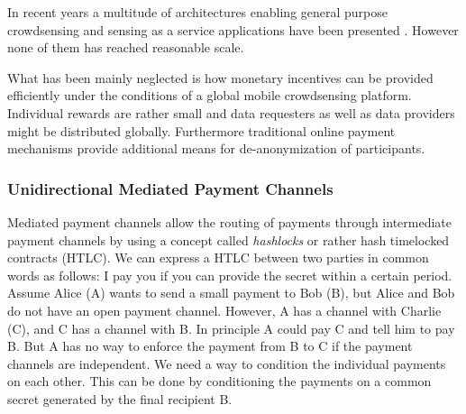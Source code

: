In recent years a multitude of architectures enabling general purpose crowdsensing and sensing as a service applications have been presented \cite{6558754,6525603,giannotti2012planetary,Haderer2015,merlino2016mobile}. However none of them has reached reasonable scale.

What has been mainly neglected is how monetary incentives can be provided efficiently under the conditions of a global mobile crowdsensing platform. 
Individual rewards are rather small and data requesters as well as data providers might be distributed globally. Furthermore traditional online payment mechanisms provide additional means for de-anonymization of participants.  


\subsubsection{Unidirectional Mediated Payment Channels}

Mediated payment channels allow the routing of payments through intermediate payment channels by using a concept called \emph{hashlocks} or rather hash timelocked contracts (HTLC). We can express a HTLC between two parties in common words as follows: I pay you if you can provide the secret within a certain period. Assume Alice (A) wants to send a small payment to Bob (B), but Alice and Bob do not have an open payment channel. However, A has a channel with Charlie (C), and C has a channel with B. In principle A could pay C and tell him to pay B. But A has no way to enforce the payment from B to C if the payment channels are independent. We need a way to condition the individual payments on each other. This can be done by conditioning the payments on a common secret generated by the final recipient B. 

